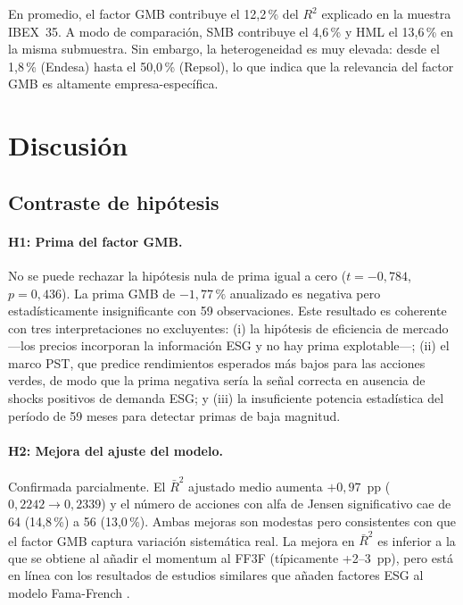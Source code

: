 \documentclass[12pt, a4paper]{article}
\begin{document}
En promedio, el factor GMB contribuye el 12{,}2\,\% del $R^2$ explicado en la muestra
IBEX~35. A modo de comparaci\'on, SMB contribuye el 4{,}6\,\% y HML el 13{,}6\,\% en
la misma submuestra. Sin embargo, la heterogeneidad es muy elevada: desde el 1{,}8\,\%
(Endesa) hasta el 50{,}0\,\% (Repsol), lo que indica que la relevancia del factor GMB
es altamente empresa-espec\'ifica.

\section{Discusi\'on}
\label{sec:discusion}

\subsection{Contraste de hip\'otesis}
\label{subsec:hipotesis_res}

\paragraph{H1: Prima del factor GMB.}
No se puede rechazar la hip\'otesis nula de prima igual a cero
($t = -0{,}784$, $p = 0{,}436$). La prima GMB de $-1{,}77\,\%$ anualizado es negativa
pero estad\'isticamente insignificante con 59 observaciones. Este resultado es coherente
con tres interpretaciones no excluyentes: (i) la hip\'otesis de eficiencia de mercado
---los precios incorporan la informaci\'on ESG y no hay prima explotable---; (ii) el
marco PST, que predice rendimientos esperados m\'as bajos para las acciones verdes, de
modo que la prima negativa ser\'ia la se\~nal correcta en ausencia de shocks positivos
de demanda ESG; y (iii) la insuficiente potencia estad\'istica del per\'iodo de 59 meses
para detectar primas de baja magnitud.

\paragraph{H2: Mejora del ajuste del modelo.}
Confirmada parcialmente. El $\bar{R}^2$ ajustado medio aumenta $+0{,}97$~pp
($0{,}2242 \to 0{,}2339$) y el n\'umero de acciones con alfa de Jensen significativo
cae de 64 (14{,}8\,\%) a 56 (13{,}0\,\%). Ambas mejoras son modestas pero consistentes
con que el factor GMB captura variaci\'on sistem\'atica real. La mejora en $\bar{R}^2$
es inferior a la que se obtiene al a\~nadir el momentum al FF3F (t\'ipicamente +2--3~pp),
pero est\'a en l\'inea con los resultados de estudios similares que a\~naden factores
ESG al modelo Fama-French \parencite{lioui2022}.
\end{document}
